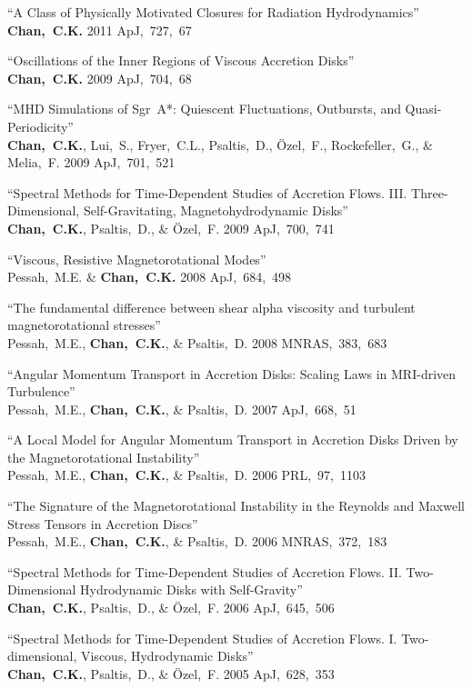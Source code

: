 \begin{ilist}
\item ``A Class of Physically Motivated Closures for Radiation Hydrodynamics''\\
  \textbf{Chan,~C.K.}
  2011 ApJ,~727,~67

\item ``Oscillations of the Inner Regions of Viscous Accretion Disks''\\
  \textbf{Chan,~C.K.}
  2009 ApJ,~704,~68

\item ``MHD Simulations of Sgr~A*: Quiescent Fluctuations, Outbursts, and Quasi-Periodicity''\\
  \textbf{Chan,~C.K.}, Lui,~S., Fryer,~C.L., Psaltis,~D., \"Ozel,~F., Rockefeller,~G., \& Melia,~F.
  2009 ApJ,~701,~521

\item ``Spectral Methods for Time-Dependent Studies of Accretion Flows.
  III. Three-Dimensional, Self-Gravitating, Magnetohydrodynamic Disks''\\
  \textbf{Chan,~C.K.}, Psaltis,~D., \& \"Ozel,~F.
  2009 ApJ,~700,~741

\item ``Viscous, Resistive Magnetorotational Modes''\\
  Pessah,~M.E. \& \textbf{Chan,~C.K.}
  2008 ApJ,~684,~498

\item ``The fundamental difference between shear alpha viscosity and turbulent magnetorotational stresses''\\
  Pessah,~M.E., \textbf{Chan,~C.K.}, \& Psaltis,~D.
  2008 MNRAS,~383,~683

\item ``Angular Momentum Transport in Accretion Disks: Scaling Laws in MRI-driven Turbulence''\\
  Pessah,~M.E., \textbf{Chan,~C.K.}, \& Psaltis,~D.
  2007 ApJ,~668,~51

\item ``A Local Model for Angular Momentum Transport in Accretion Disks Driven by the Magnetorotational Instability''\\
  Pessah,~M.E., \textbf{Chan,~C.K.}, \& Psaltis,~D.
  2006 PRL,~97,~1103

\item ``The Signature of the Magnetorotational Instability in the Reynolds and Maxwell Stress Tensors in Accretion Discs''\\
  Pessah,~M.E., \textbf{Chan,~C.K.}, \& Psaltis,~D.
  2006 MNRAS,~372,~183

\item ``Spectral Methods for Time-Dependent Studies of Accretion Flows.
  II. Two-Dimensional Hydrodynamic Disks with Self-Gravity''\\
  \textbf{Chan,~C.K.}, Psaltis,~D., \& \"Ozel,~F.
  2006 ApJ,~645,~506

\item ``Spectral Methods for Time-Dependent Studies of Accretion Flows.
  I. Two-dimensional, Viscous, Hydrodynamic Disks''\\
  \textbf{Chan,~C.K.}, Psaltis,~D., \& \"Ozel,~F.
  2005 ApJ,~628,~353

\end{ilist}
